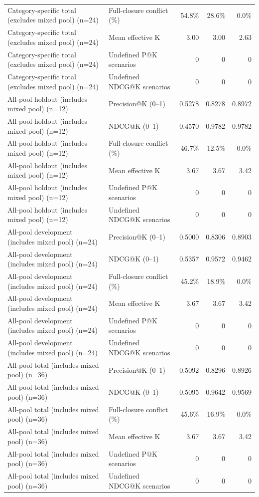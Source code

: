 \begin{table}[t]
\begin{tabular}{llrrr}
Category-specific total (excludes mixed pool) (n=24) & Full-closure conflict (\%) & 54.8\% & 28.6\% & 0.0\% \\
Category-specific total (excludes mixed pool) (n=24) & Mean effective K & 3.00 & 3.00 & 2.63 \\
Category-specific total (excludes mixed pool) (n=24) & Undefined P@K scenarios & 0 & 0 & 0 \\
Category-specific total (excludes mixed pool) (n=24) & Undefined NDCG@K scenarios & 0 & 0 & 0 \\
All-pool holdout (includes mixed pool) (n=12) & Precision@K (0--1) & 0.5278 & 0.8278 & 0.8972 \\
All-pool holdout (includes mixed pool) (n=12) & NDCG@K (0--1) & 0.4570 & 0.9782 & 0.9782 \\
All-pool holdout (includes mixed pool) (n=12) & Full-closure conflict (\%) & 46.7\% & 12.5\% & 0.0\% \\
All-pool holdout (includes mixed pool) (n=12) & Mean effective K & 3.67 & 3.67 & 3.42 \\
All-pool holdout (includes mixed pool) (n=12) & Undefined P@K scenarios & 0 & 0 & 0 \\
All-pool holdout (includes mixed pool) (n=12) & Undefined NDCG@K scenarios & 0 & 0 & 0 \\
All-pool development (includes mixed pool) (n=24) & Precision@K (0--1) & 0.5000 & 0.8306 & 0.8903 \\
All-pool development (includes mixed pool) (n=24) & NDCG@K (0--1) & 0.5357 & 0.9572 & 0.9462 \\
All-pool development (includes mixed pool) (n=24) & Full-closure conflict (\%) & 45.2\% & 18.9\% & 0.0\% \\
All-pool development (includes mixed pool) (n=24) & Mean effective K & 3.67 & 3.67 & 3.42 \\
All-pool development (includes mixed pool) (n=24) & Undefined P@K scenarios & 0 & 0 & 0 \\
All-pool development (includes mixed pool) (n=24) & Undefined NDCG@K scenarios & 0 & 0 & 0 \\
All-pool total (includes mixed pool) (n=36) & Precision@K (0--1) & 0.5092 & 0.8296 & 0.8926 \\
All-pool total (includes mixed pool) (n=36) & NDCG@K (0--1) & 0.5095 & 0.9642 & 0.9569 \\
All-pool total (includes mixed pool) (n=36) & Full-closure conflict (\%) & 45.6\% & 16.9\% & 0.0\% \\
All-pool total (includes mixed pool) (n=36) & Mean effective K & 3.67 & 3.67 & 3.42 \\
All-pool total (includes mixed pool) (n=36) & Undefined P@K scenarios & 0 & 0 & 0 \\
All-pool total (includes mixed pool) (n=36) & Undefined NDCG@K scenarios & 0 & 0 & 0 \\
\bottomrule
\end{tabular}
\end{table}